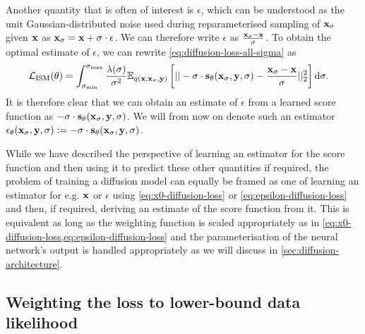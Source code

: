 Another quantity that is often of interest is $\epsilon$, which can be understood as the unit Gaussian-distributed noise used during reparameterised sampling of ${\mathbf{x}}_\sigma$ given ${\mathbf{x}}$ as ${\mathbf{x}}_\sigma = {\mathbf{x}} + \sigma \cdot \epsilon$. We can therefore write $\epsilon$ as $\frac{{\mathbf{x}}_\sigma-{\mathbf{x}}}{\sigma}$. To obtain the optimal estimate of $\epsilon$, we can rewrite \cref{eq:diffusion-loss-all-sigma} as
\begin{align} \label{eq:epsilon-diffusion-loss}
    \mathcal{L}_\text{ISM}(\theta) &= \int_{\sigma_\text{min}}^{\sigma_\text{max}} \frac{\lambda(\sigma)}{\sigma^2} \mathbb{E}_{q({\mathbf{x}}, {\mathbf{x}}_\sigma, {\mathbf{y}})} \left[ 
    || -\sigma \cdot {\mathbf{s}}_\theta({\mathbf{x}}_\sigma, {\mathbf{y}}, \sigma) - \frac{{\mathbf{x}}_\sigma-{\mathbf{x}}}{\sigma} ||_2^2 \right] \mathrm{d}\sigma.
\end{align}
It is therefore clear that we can obtain an estimate of $\epsilon$ from a learned score function as $-\sigma \cdot {\mathbf{s}}_\theta({\mathbf{x}}_\sigma, {\mathbf{y}}, \sigma)$. We will from now on denote such an estimator $\mathbf{\epsilon}_\theta({\mathbf{x}}_\sigma, {\mathbf{y}}, \sigma) := -\sigma \cdot {\mathbf{s}}_\theta({\mathbf{x}}_\sigma, {\mathbf{y}}, \sigma)$.

While we have described the perspective of learning an estimator for the score function and then using it to predict these other quantities if required, the problem of training a diffusion model can equally be framed as one of learning an estimator for e.g. ${\mathbf{x}}$ or $\epsilon$ using \cref{eq:x0-diffusion-loss} or \cref{eq:epsilon-diffusion-loss} and then, if required, deriving an estimate of the score function from it. This is equivalent as long as the weighting function is scaled appropriately as in \cref{eq:x0-diffusion-loss,eq:epsilon-diffusion-loss} and the parameterisation of the neural network's output is handled appropriately as we will discuss in 
\cref{sec:diffusion-architecture}. 

\subsection{Weighting the loss to lower-bound data likelihood} \label{sec:diffusion-likelihood}

